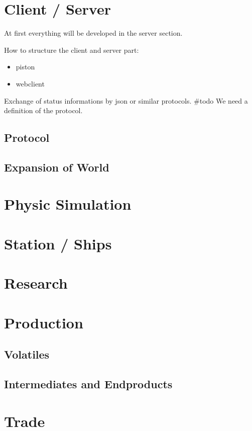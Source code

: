 \section{Client / Server}
At first everything will be developed in the server section. 

How to structure the client and server part:
\begin{itemize}
 \item piston 
 \item webclient
\end{itemize}
Exchange of status informations by json or similar protocols. #todo We need a definition of the protocol.

\subsection{Protocol}

\subsection{Expansion of World}

\section{Physic Simulation}

\section{Station / Ships}

\section{Research}

\section{Production}

\subsection{Volatiles}

\subsection{Intermediates and Endproducts}

\section{Trade}



